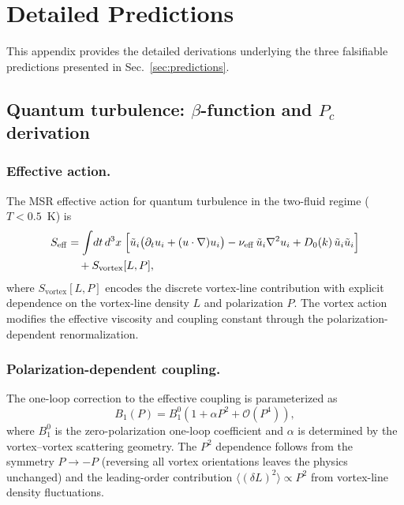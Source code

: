 \section{Detailed Predictions\label{app:detailed_predictions}}

This appendix provides the detailed derivations underlying the three falsifiable predictions presented in Sec.~\ref{sec:predictions}.

\subsection{Quantum turbulence: $\beta$-function and $P_c$ derivation\label{app:pred_qt}}

\subsubsection*{Effective action.}
The MSR effective action for quantum turbulence in the two-fluid regime ($T<0.5$~K) is
\begin{equation}
\begin{split}
S_{\mathrm{eff}} &= \int\!dt\,d^3x\;\Bigl[\tilde{u}_i\bigl(\partial_t u_i + (u\cdot\nabla)u_i\bigr) - \nu_{\mathrm{eff}}\,\tilde{u}_i\nabla^2 u_i + D_0(k)\,\tilde{u}_i\tilde{u}_i\Bigr] \\
&\quad + S_{\mathrm{vortex}}[L, P],
\end{split}
\end{equation}
where $S_{\mathrm{vortex}}[L,P]$ encodes the discrete vortex-line contribution with explicit dependence on the vortex-line density $L$ and polarization $P$. The vortex action modifies the effective viscosity and coupling constant through the polarization-dependent renormalization.

\subsubsection*{Polarization-dependent coupling.}
The one-loop correction to the effective coupling is parameterized as
\begin{equation}
B_1(P) = B_1^0\left(1 + \alpha P^2 + \mathcal{O}(P^4)\right),
\end{equation}
where $B_1^0$ is the zero-polarization one-loop coefficient and $\alpha$ is determined by the vortex--vortex scattering geometry. The $P^2$ dependence follows from the symmetry $P\to -P$ (reversing all vortex orientations leaves the physics unchanged) and the leading-order contribution $\langle(\delta L)^2\rangle\propto P^2$ from vortex-line density fluctuations.

